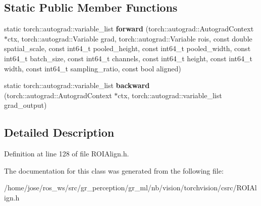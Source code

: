 \subsection*{Static Public Member Functions}
\begin{DoxyCompactItemize}
\item 
\mbox{\label{classROIAlignBackwardFunction_a16683f4a3b1a98fc7a47490e4a295cef}} 
static torch\+::autograd\+::variable\+\_\+list {\bfseries forward} (torch\+::autograd\+::\+Autograd\+Context $\ast$ctx, torch\+::autograd\+::\+Variable grad, torch\+::autograd\+::\+Variable rois, const double spatial\+\_\+scale, const int64\+\_\+t pooled\+\_\+height, const int64\+\_\+t pooled\+\_\+width, const int64\+\_\+t batch\+\_\+size, const int64\+\_\+t channels, const int64\+\_\+t height, const int64\+\_\+t width, const int64\+\_\+t sampling\+\_\+ratio, const bool aligned)
\item 
\mbox{\label{classROIAlignBackwardFunction_aeed4272d05a2a0af7b37a08bc37120fc}} 
static torch\+::autograd\+::variable\+\_\+list {\bfseries backward} (torch\+::autograd\+::\+Autograd\+Context $\ast$ctx, torch\+::autograd\+::variable\+\_\+list grad\+\_\+output)
\end{DoxyCompactItemize}


\subsection{Detailed Description}


Definition at line 128 of file R\+O\+I\+Align.\+h.



The documentation for this class was generated from the following file\+:\begin{DoxyCompactItemize}
\item 
/home/jose/ros\+\_\+ws/src/gr\+\_\+perception/gr\+\_\+ml/nb/vision/torchvision/csrc/R\+O\+I\+Align.\+h\end{DoxyCompactItemize}
